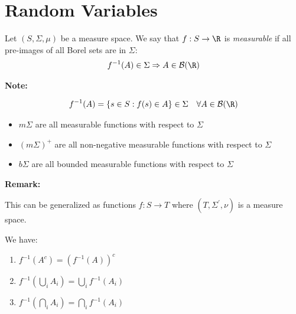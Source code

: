 \section{Random Variables}
\par\bigskip
\begin{defo}{}
  Let $(S,\Sigma, \mu)$ be a measure space. We say that $f:S\to\R$ is \textit{measurable} if all pre-images of all Borel sets are in $\Sigma$:
  \begin{equation*}
    \begin{gathered}
      f^{-1}(A)\in\Sigma\Rightarrow A\in\mathcal{B}(\R)
    \end{gathered}
  \end{equation*}
\end{defo}
\par\bigskip
\noindent\textbf{Note:}\par
\begin{equation*}
  \begin{gathered}
    f^{-1}(A) = \left\{s\in S:f(s)\in A\right\}\in\Sigma\quad\forall A\in\mathcal{B}(\R)
  \end{gathered}
\end{equation*}\par
\begin{itemize}
  \item $m\Sigma$ are all measurable functions with respect to $\Sigma$
  \item $(m\Sigma)^+$ are all non-negative measurable functions with respect to $\Sigma$
  \item $b\Sigma$ are all bounded measurable functions with respect to $\Sigma$
\end{itemize}
\par\bigskip
\noindent\textbf{Remark:}\par
\noindent This can be generalized as functions $f:S\to T$ where $(T, \Sigma^{\prime}, \nu)$ is a measure space.
\par\bigskip
\begin{lem}[]{}
  We have:\par
  \begin{enumerate}[leftmargin=*]
    \item $f^{-1}(A^c) = (f^{-1}(A))^c$
    \item $f^{-1}\left(\bigcup_i A_i\right) = \bigcup_i f^{-1}(A_i)$
    \item $f^{-1}\left(\bigcap_i A_i\right) = \bigcap_i f^{-1}(A_i)$
  \end{enumerate}
\end{lem}
